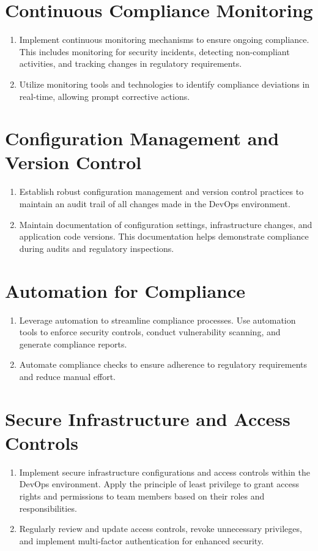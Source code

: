 \section*{Continuous Compliance Monitoring}
\begin{enumerate}
    \item Implement continuous monitoring mechanisms to ensure ongoing compliance. This includes monitoring for security incidents, detecting non-compliant activities, and tracking changes in regulatory requirements.

    \item Utilize monitoring tools and technologies to identify compliance deviations in real-time, allowing prompt corrective actions.
\end{enumerate}

\section*{Configuration Management and Version Control}
\begin{enumerate}
    \item Establish robust configuration management and version control practices to maintain an audit trail of all changes made in the DevOps environment.

    \item Maintain documentation of configuration settings, infrastructure changes, and application code versions. This documentation helps demonstrate compliance during audits and regulatory inspections.
\end{enumerate}

\section*{Automation for Compliance}
\begin{enumerate}
    \item Leverage automation to streamline compliance processes. Use automation tools to enforce security controls, conduct vulnerability scanning, and generate compliance reports.

    \item Automate compliance checks to ensure adherence to regulatory requirements and reduce manual effort.
\end{enumerate}

\section*{Secure Infrastructure and Access Controls}
\begin{enumerate}
    \item Implement secure infrastructure configurations and access controls within the DevOps environment. Apply the principle of least privilege to grant access rights and permissions to team members based on their roles and responsibilities.

    \item Regularly review and update access controls, revoke unnecessary privileges, and implement multi-factor authentication for enhanced security.
\end{enumerate}

